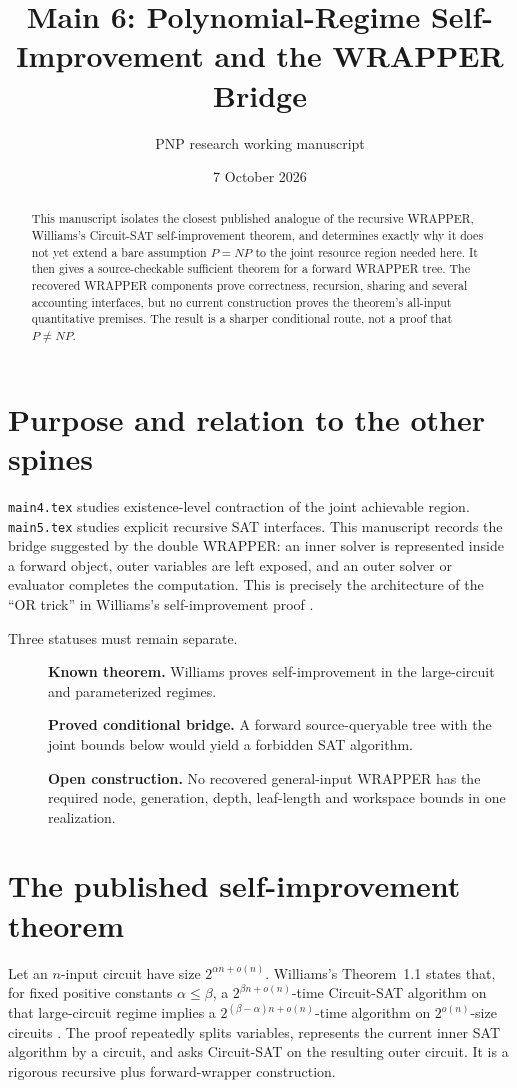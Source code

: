 \documentclass[11pt]{article}
\title{Main 6: Polynomial-Regime Self-Improvement and the WRAPPER Bridge}
\author{PNP research working manuscript}
\date{7 October 2026}
\begin{document}
\maketitle

\begin{abstract}
This manuscript isolates the closest published analogue of the recursive
WRAPPER, Williams's Circuit-SAT self-improvement theorem, and determines
exactly why it does not yet extend a bare assumption $P=NP$ to the joint
resource region needed here.  It then gives a source-checkable sufficient
theorem for a forward WRAPPER tree.  The recovered WRAPPER components prove
correctness, recursion, sharing and several accounting interfaces, but no
current construction proves the theorem's all-input quantitative premises.
The result is a sharper conditional route, not a proof that $P\ne NP$.
\end{abstract}

\section{Purpose and relation to the other spines}
\texttt{main4.tex} studies existence-level contraction of the joint
achievable region.  \texttt{main5.tex} studies explicit recursive SAT
interfaces.  This manuscript records the bridge suggested by the double
WRAPPER: an inner solver is represented inside a forward object, outer
variables are left exposed, and an outer solver or evaluator completes the
computation.  This is precisely the architecture of the ``OR trick'' in
Williams's self-improvement proof \cite{williams2024}.

Three statuses must remain separate.
\begin{description}
\item[] \textbf{Known theorem.} Williams proves self-improvement in the
large-circuit and parameterized regimes.
\item[] \textbf{Proved conditional bridge.} A forward source-queryable tree
with the joint bounds below would yield a forbidden SAT algorithm.
\item[] \textbf{Open construction.} No recovered general-input WRAPPER has
the required node, generation, depth, leaf-length and workspace bounds in one
realization.
\end{description}

\section{The published self-improvement theorem}
Let an $n$-input circuit have size $2^{\alpha n+o(n)}$.  Williams's
Theorem~1.1 states that, for fixed positive constants $\alpha\le\beta$, a
$2^{\beta n+o(n)}$-time Circuit-SAT algorithm on that large-circuit regime
implies a $2^{(\beta-\alpha)n+o(n)}$-time algorithm on
$2^{o(n)}$-size circuits \cite{williams2024}.  The proof repeatedly splits
variables, represents the current inner SAT algorithm by a circuit, and asks
Circuit-SAT on the resulting outer circuit.  It is a rigorous recursive plus
forward-wrapper construction.
\end{document}
